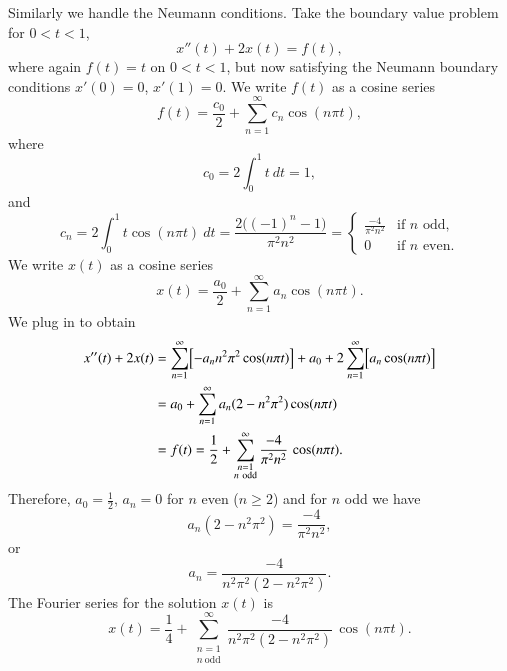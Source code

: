 \begin{example}
Similarly we handle the Neumann conditions.
Take the boundary value problem for $0 < t < 1$,
\begin{equation*}
x''(t) + 2 x(t) = f(t) ,
\end{equation*}
where again $f(t) = t$ on $0 < t < 1$, but now satisfying
the Neumann boundary conditions
$x'(0) = 0$, $x'(1)=0$.
We write $f(t)$ as a cosine series
\begin{equation*}
f(t) = \frac{c_0}{2} + \sum_{n=1}^\infty c_n \cos (n \pi t) ,
\end{equation*}
where
\begin{equation*}
c_0 = 2 \int_0^1 t ~dt = 1 ,
\end{equation*}
and
\begin{equation*}
c_n = 2 \int_0^1 t \cos (n \pi t) ~dt =
\frac{2\bigl({(-1)}^n-1\bigr)}{\pi^2 n^2} = 
\begin{cases}
\frac{-4}{\pi^2 n^2} & \text{if } n \text{ odd} , \\
0 & \text{if } n \text{ even}.
\end{cases}
\end{equation*}
We write $x(t)$ as a cosine series
\begin{equation*}
x(t) = \frac{a_0}{2} + \sum_{n=1}^\infty a_n \cos (n \pi t) .
\end{equation*}
We plug in to obtain 
\begin{equation*}
\begin{split}
x''(t) + 2 x(t) & =
\sum_{n=1}^\infty \Bigl[ - a_n n^2 \pi^2 \cos (n \pi t) \Bigr]
+
a_0 +
2
\sum_{n=1}^\infty \Bigl[ a_n \cos (n \pi t) \Bigr]
\\
& =
a_0 +
\sum_{n=1}^\infty a_n (2 - n^2 \pi^2 ) \cos (n \pi t)
\\
& = f(t)
=
\frac{1}{2} +
\sum_{\substack{n=1\\n~\text{odd}}}^\infty
\frac{-4}{\pi^2 n^2} \, \cos (n \pi t) .
\end{split}
\end{equation*}
Therefore, $a_0 = \frac{1}{2}$, $a_n = 0$ for $n$ even ($n \geq 2$) and for
$n$ odd we have
\begin{equation*}
a_n (2 - n^2 \pi^2)
=
\frac{-4}{\pi^2 n^2} ,
\end{equation*}
or
\begin{equation*}
a_n
=
\frac{-4}{n^2 \pi^2 (2 - n^2 \pi^2)} .
\end{equation*}
The Fourier series for the solution $x(t)$ is
\begin{equation*}
x(t) = 
\frac{1}{4} +
\sum_{\substack{n=1\\n~\text{odd}}}^\infty
\frac{-4}{n^2 \pi^2 (2 - n^2 \pi^2)} \,
\cos (n \pi t) .
\end{equation*}
\end{example}

